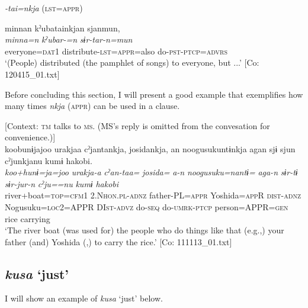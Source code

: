 \begin{xlist}
  \exi{} \textit{{}-tai=nkja} (\textsc{lst}=\textsc{appr})

  \ex  %
      \glll    minnan  kˀubatainkjan  sjanmun,\\
      \textit{minna=n}  \textit{kˀubar-=n}  \textit{sɨr-tar-n=mun}\\
      everyone=\textsc{dat}1  distribute-\textsc{lst}=\textsc{appr}=also  do-\textsc{pst}-\textsc{ptcp}=\textsc{advrs}\\
      \glt       ‘(People) distributed (the pamphlet of songs) to everyone, but ...’ [Co: 120415\_01.txt]
  \end{xlist}
\z

  Before concluding this section, I will present a good example that exemplifies how many times \textit{nkja} (\textsc{appr}) can be used in a clause.

\ea\label{ex:10.27}   [Context: \textsc{tm} talks to \textsc{ms}. (MS’s reply is omitted from the convesation for convenience.)]\\
      \glll    koobunɨjajoo  urakjaa  cˀjantankja,  josidankja,  an  noogusukuntɨnkja  agan  sjɨ  sjun  cˀjunkjanu  kumɨ  {\textbar}hakobi{\textbar}.\\
    \textit{koo+hunɨ=ja=joo}  \textit{urakja-a}  \textit{cˀan-taa=}  \textit{josida=}  \textit{a-n}  \textit{noogusuku=nantɨ=}  \textit{aga-n}  \textit{sɨr-tɨ}  \textit{sɨr-jur-n}  \textit{cˀju==nu}  \textit{kumɨ}  \textit{hakobi}\\
    river+boat=\textsc{top}=\textsc{cfm}1  2.N\textsc{hon}.\textsc{pl}-\textsc{adnz}  father-PL=\textsc{appr}  Yoshida=\textsc{app}R  \textsc{dist}-\textsc{adnz}  Nogusuku=\textsc{loc}2=APPR  DI\textsc{st}-\textsc{advz}  do-\textsc{seq}  do-\textsc{umrk}-\textsc{ptcp}  person=APPR=\textsc{gen}  rice  carrying\\
\glt     ‘The river boat (was used for) the people who do things like that (e.g.,) your father (and) Yoshida (,) to carry the rice.’  [Co: 111113\_01.txt]
\z

\subsection{\textit{kusa} ‘just’}\label{sec:10.1.7}

I will show an example of \textit{kusa} ‘just’ below.

